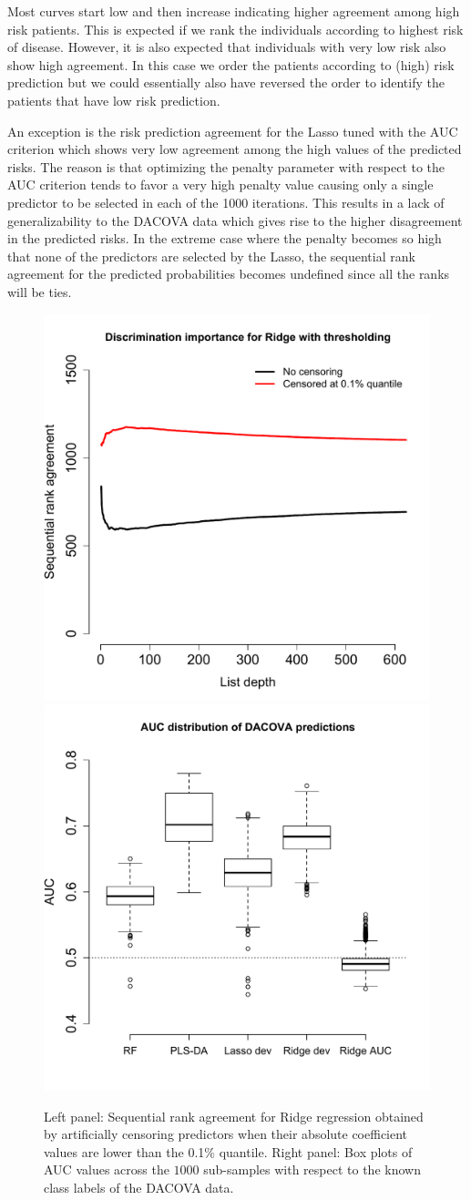\documentclass[12pt,a4paper]{article}
\theoremstyle{plain}
\begin{document}
Most curves start low and then increase indicating higher agreement
among high risk patients. This is expected if we rank the individuals
according to highest risk of disease. However, it is also expected
that individuals with very low risk also show high agreement. In this
case we order the patients according to (high) risk prediction but we
could essentially also have reversed the order to identify the
patients that have low risk prediction.

An exception is the risk prediction agreement for the Lasso tuned with the AUC criterion which
shows very low agreement among the high values of the predicted
risks. The reason is that optimizing the penalty parameter with
respect to the AUC criterion tends to favor a very high penalty value
causing only a single predictor to be selected in each of the 1000
iterations. This results in a lack of generalizability to the DACOVA
data which gives rise to the higher disagreement in the predicted risks.
In the extreme case where the penalty becomes so high
that none of the predictors are selected by the Lasso, the sequential
rank agreement for the predicted probabilities becomes undefined since
all the ranks will be ties.

\begin{figure}[htbp]
\begin{center}
\includegraphics[width=.49\textwidth]{pics/ridgeCensoring}%
\includegraphics[width=.49\textwidth]{pics/aucPlot}
\end{center}
\caption{Left panel: Sequential rank agreement for Ridge regression
  obtained by artificially censoring predictors when their absolute
  coefficient values are lower than the 0.1\% quantile. Right panel:
  Box plots of AUC values across the $1000$ sub-samples with respect
  to the known class labels of the DACOVA data.}
 \label{fig:app2}
\end{figure}
\end{document}
